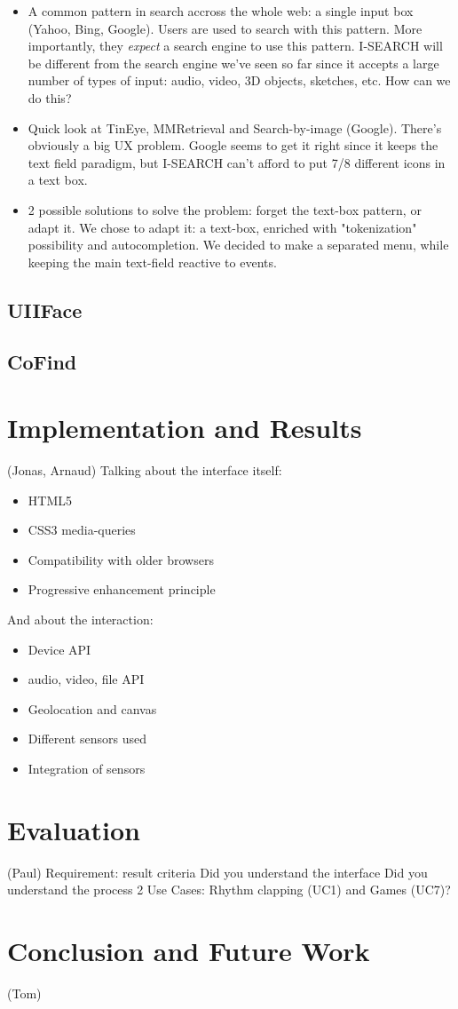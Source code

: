 \documentclass[runningheads,a4paper]{llncs}
\begin{document}
\begin{itemize}
\item A common pattern in search accross the whole web: a single input box (Yahoo, Bing, Google). Users are used to search with this pattern. More importantly, they \emph{expect} a search engine to use this pattern. I-SEARCH will be different from the search engine we've seen so far since it accepts a large number of types of input: audio, video, 3D objects, sketches, etc. How can we do this?
 
\item Quick look at TinEye, MMRetrieval and Search-by-image (Google). There's obviously a big UX problem. Google seems to get it right since it keeps the text field paradigm, but I-SEARCH can't afford to put 7/8 different icons in a text box.
\item 2 possible solutions to solve the problem: forget the text-box pattern, or adapt it. We chose to adapt it: a text-box, enriched with "tokenization" possibility and autocompletion. We decided to make a separated menu, while keeping the main text-field reactive to events.
\end{itemize}

\subsection{UIIFace}

\subsection{CoFind}

\section{Implementation and Results}
(Jonas, Arnaud)
Talking about the interface itself: 
\begin{itemize}
\item HTML5
\item CSS3 media-queries
\item Compatibility with older browsers
\item Progressive enhancement principle
\end{itemize}

And about the interaction: 
\begin{itemize}
\item Device API
\item audio, video, file API
\item Geolocation and canvas
\item Different sensors used
\item Integration of sensors
\end{itemize}
\section{Evaluation}
(Paul)
Requirement: result criteria
Did you understand the interface
Did you understand the process
2 Use Cases: Rhythm clapping (UC1) and Games (UC7)?

\section{Conclusion and Future Work}
(Tom)



\end{document}
